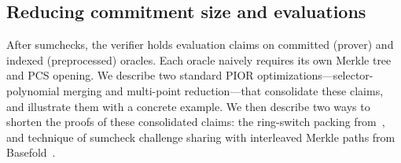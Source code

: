 
\subsection{Reducing commitment size and evaluations}
\label{sec:reducing-commitments}

After sumchecks, the verifier holds evaluation claims on committed (prover) and indexed (preprocessed) oracles. Each oracle naively requires its own Merkle tree and PCS opening. We describe two standard PIOR optimizations---selector-polynomial merging and multi-point reduction---that consolidate these claims, and illustrate them with a concrete example. We then describe two ways to shorten the proofs of these consolidated claims: the ring-switch packing from~\cite{EC:DiaPos25}, and technique of sumcheck challenge sharing with interleaved Merkle paths from Basefold~\cite{basefold}.

